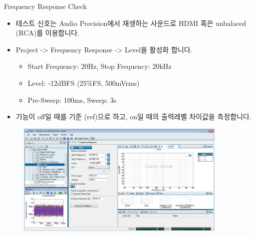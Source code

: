 \documentclass{beamer}
\begin{document}
	
	\begin{frame}[t]{Frequency Response Check}
		\begin{itemize}
			\item 테스트 신호는 Audio Precision에서 재생하는 사운드로 HDMI 혹은 unbalaced (RCA)를 이용합니다.
			\item Project -> Frequency Response -> Level을 활성화 합니다.
			\begin{itemize}
				\item Start Frequency: 20Hz, Stop Frequency: 20kHz
				\item Level: -12dBFS (25\%FS, 500mVrms)
				\item Pre-Sweep: 100ms, Sweep: 3s
			\end{itemize}
			\item 기능이 off일 때를 기준 (ref)으로 하고, on일 때의 출력레벨 차이값을 측정합니다.
		\end{itemize}
		
		\begin{figure}[b]
			\includegraphics[width=0.9\textwidth]{figure/apsetting/frequencyResponse.png}
		\end{figure}
		
	\end{frame}
	
\end{document}

